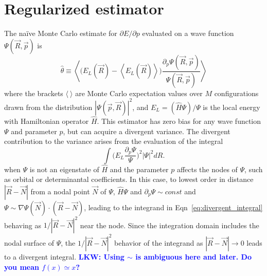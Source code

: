 \documentclass[twocolumn]{revtex4-1}
\newcommand{\lucas}[1]{\textbf{\textcolor{blue}{LKW: #1}}}
\begin{document}
\section{Regularized estimator}
The na\"ive Monte Carlo estimate for $\partial E/\partial p$ evaluated on a wave function $\Psi(\vec{R}, \vec{p})$ is 
\begin{equation}
\hat{\theta} \equiv \left\langle \Big(E_L(\vec{R})  - \left\langle E_L(\vec{R}) \right \rangle\Big)\frac{\partial_p \Psi(\vec{R}, \vec{p})}{\Psi(\vec{R}, \vec{p})} \right\rangle
\label{eq:naive_estimator}
\end{equation} 
where the brackets $\langle \ \rangle$ are Monte Carlo expectation values over $M$ configurations drawn from the distribution $|\Psi(\vec{p}, \vec{R})|^2$, and $E_L = (\hat{H}\Psi)/\Psi$ is the local energy with Hamiltonian operator $\hat{H}$.
This estimator has zero bias for any wave function $\Psi$ and parameter $p$, but can acquire a divergent variance.
The divergent contribution to the variance arises from the evaluation of the integral
\begin{equation}
\int \Big(E_L\frac{\partial_p\Psi}{\Psi}\Big)^2 |\Psi|^2 dR.
\label{eq:divergent_integral}
\end{equation}
when $\Psi$ is not an eigenstate of $\hat{H}$ and the parameter $p$ affects the nodes of $\Psi$, such as orbital or determinantal coefficients.
In this case, to lowest order in distance $|\vec{R}-\vec{N}|$ from a nodal point $\vec{N}$ of $\Psi$, $\hat{H}\Psi$ and $\partial_p \Psi \sim const$ and $\Psi \sim \nabla \Psi(\vec{N}) \cdot (\vec{R} - \vec{N})$, leading to the integrand in Eqn~\ref{eq:divergent_integral} behaving as $1/|\vec{R}-\vec{N}|^2$ near the node.
Since the integration domain includes the nodal surface of $\Psi$, the $1/|\vec{R}-\vec{N}|^2$ behavior of the integrand as $|\vec{R}-\vec{N}|\rightarrow 0$ leads to a divergent integral.
\lucas{Using $\sim$ is ambiguous here and later. Do you mean $f(x) \simeq x$? }
\end{document}
